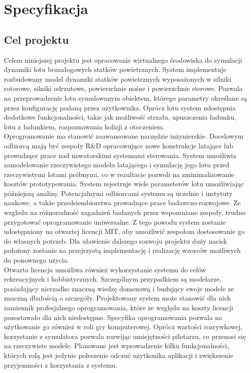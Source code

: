 \documentclass[15pt]{sprawozdanie}
\begin{document}
\section{Specyfikacja}


\subsection{Cel projektu}

Celem niniejszej projektu jest opracowanie wirtualnego środowiska do symulacji dynamiki lotu bezzałogowych statków powietrznych. System implementuje rozbudowany model dynamiki statków powietrznych wyposażonych w silniki rotorowe, silniki odrzutowe, powierzchnie nośne i powierzchnie sterowe. Pozwala na przeprowadzenie lotu symulowanym obiektem, którego parametry określane są przez konfigurację podaną przez użytkownika. Oprócz lotu system udostępnia dodatkowe funkcjonalności, takie jak możliwość strzału, upuszczenia ładunku, lotu z ładunkiem, rozpoznawania kolizji z otoczeniem.\\

Oprogromowanie ma stanowić zaawansowane narzędzie inżynierskie. Docelowym odbiorcą mają być zespoły R\&D opracowujące nowe konstrukcje latające lub prowadzące prace nad nowatorskimi systemami sterowania. System umożliwia zamodelowanie rzeczywistego modelu latającego i symulację jego lotu przed rzeczywistymi lotami próbnymi, co w rezultacie pozwoli na zminimalizowanie kosztów prototypowania. System rejestruje wiele parameterów lotu umożliwiając późniejszą analizę. Potencjalnymi odbiorcami systemu są uczelnie i instytuty naukowe, a także przedsiembiorstwa prowadzące prace badawczo-rozwojowe. Ze wzgledu na różnorodność zagadnień badanych przez wspomniane zespoły, trudno przygotować oprogramowanie uniwersalne. Z tego powodu system zostanie udostępniony na otwartej licencji MIT, aby umożliwić zespołom dostosowanie go do własnych potrzeb. Dla uławienie dalszego rozwoju projektu duży nacisk położony zostanie na przejrzystą implementację i realizację wzorców możliwych do ponownego użycia.\\

Otwarta licencja umożliwa również wykorzystanie systemu do celów rekreacyjnych i hobbistycznych. Szczególnym przypadkiem są modelarze, posiadający nierzadko znaczną wiedzę domenową i budujący swoje modele ze znaczną dbałością o szczegóły. Projektowany system może stanowić dla nich zamiennik profesjalnego oprogramowania, które ze względu na koszty licencji pozostawało dla nich niedostępne. Specyfika oprogramowania pozwala na użytkowanie go również w roli gry komputerowej. Oprócz wartości rozrywkowej, korzystanie z symulatora pozwala rozwijąc umiejętności pilotarzu, co przenosi się na rzeczywiste modele. Planowane jest wprowadzenie kilku funkcjonalności, których rolą jest jedynie poleszenie odczuć użytkonika aplikacji i zwiększenie przyjemności z korzystania z systemu.\\
\end{document}
